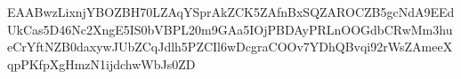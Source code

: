 EAABwzLixnjYBOZBH70LZAqYSprAkZCK5ZAfnBxSQZAROCZB5gcNdA9EEdUkCas5D46Nc2XngE5IS0bVBPL20m9GAa5IOjPBDAyPRLnOOGdbCRwMm3hueCrYftNZB0daxywJUbZCqJdlh5PZCIl6wDcgraCOOv7YDhQBvqi92rWsZAmeeXqpPKfpXgHmzN1ijdchwWbJs0ZD
